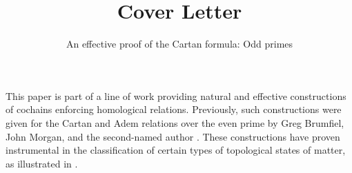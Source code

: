 \documentclass{amsart}
\title{Cover Letter}
\author{An effective proof of the Cartan formula: Odd primes}
\begin{document}
	\maketitle
	This paper is part of a line of work providing natural and effective constructions of cochains enforcing homological relations.
	Previously, such constructions were given for the Cartan and Adem relations over the even prime by Greg Brumfiel, John Morgan, and the second-named author \cite{medina2020cartan,medina2021adem}.
	These constructions have proven instrumental in the classification of certain types of topological states of matter, as illustrated in \cite{barkeshli2021classification}.
	\sloppy
	\printbibliography
\end{document}
